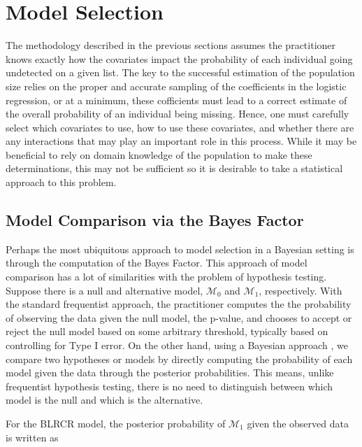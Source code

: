 \documentclass[
  12pt,
]{article}
\begin{document}
\section{Model Selection}
\label{Sec:modelselection}

The methodology described in the previous sections assumes the
practitioner knows exactly how the covariates impact the probability of
each individual going undetected on a given list. The key to the
successful estimation of the population size relies on the proper and
accurate sampling of the coefficients in the logistic regression, or at
a minimum, these cofficients must lead to a correct estimate of the
overall probability of an individual being missing. Hence, one must
carefully select which covariates to use, how to use these covariates,
and whether there are any interactions that may play an important role
in this process. While it may be beneficial to rely on domain knowledge
of the population to make these determinations, this may not be
sufficient so it is desirable to take a statistical approach to this
problem.

\subsection{Model Comparison via the Bayes Factor}

Perhaps the most ubiquitous approach to model selection in a Bayesian
setting is through the computation of the Bayes Factor. This approach of
model comparison has a lot of similarities with the problem of
hypothesis testing. Suppose there is a null and alternative model,
\(\mathcal{M}_0\) and \(\mathcal{M}_1\), respectively. With the standard
frequentist approach, the practitioner computes the the probability of
observing the data given the null model, the p-value, and chooses to
accept or reject the null model based on some arbitrary threshold,
typically based on controlling for Type I error. On the other hand,
using a Bayesian approach
\citep{jeffreys_tests_1935,jeffreys_theory_1967}, we compare two
hypotheses or models by directly computing the probability of each model
given the data through the posterior probabilities. This means, unlike
frequentist hypothesis testing, there is no need to distinguish between
which model is the null and which is the alternative.

For the BLRCR model, the posterior probability of \(\mathcal{M}_1\)
given the observed data is written as

\vspace{-20px}
\end{document}
